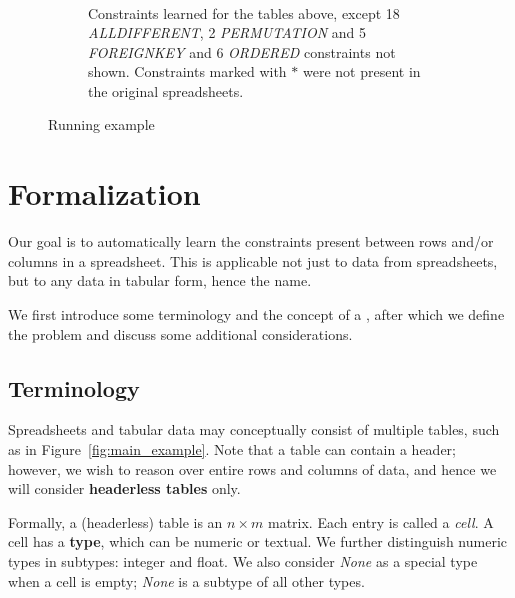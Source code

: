 \begin{figure}[thb]
\begin{subfigure}{1\textwidth}
{\begin{align*}
%
%
%
%
    \end{align*}}
  \vspace{-10pt}
  \caption{Constraints learned for the tables above, except 18 \textit{ALLDIFFERENT}, 2 \textit{PERMUTATION} and 5 \textit{FOREIGNKEY} and 6 \textit{ORDERED} constraints not shown.
  Constraints marked with $*$ were not present in the original spreadsheets.}
  \label{fig:sol_example}
\end{subfigure}
  \caption{Running example}
\end{figure}


\section{Formalization}\label{sec:formalization}
Our goal is to automatically learn the constraints present between rows and/or columns in a spreadsheet. This is applicable not just to data from spreadsheets, but to any data in tabular form, hence the name.


We first introduce some terminology and the concept of a \template, after which we define the problem and discuss some additional considerations.

\subsection{Terminology}
Spreadsheets and tabular data may conceptually consist of multiple tables, such as in Figure~\ref{fig:main_example}. Note that a table can contain a header; however, we wish to reason over entire rows and columns of data, and hence we will consider \textbf{headerless tables} only.

Formally, a (headerless) table is an $n \times m$ matrix. Each entry is called a \textit{cell}.
A cell has a {\bf type}, which can be numeric or textual. We further distinguish numeric types in subtypes: integer and float. We also consider \textit{None} as a special type when a cell is empty; \textit{None} is a subtype of all other types.

